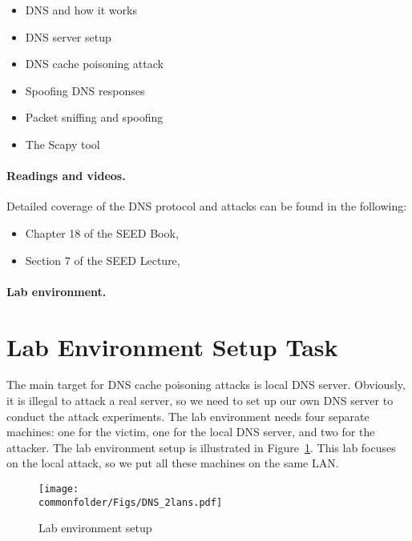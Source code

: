 \begin{itemize}[noitemsep]
\item DNS and how it works
\item DNS server setup
\item DNS cache poisoning attack
\item Spoofing DNS responses
\item Packet sniffing and spoofing
\item The Scapy tool
\end{itemize}


\paragraph{Readings and videos.}
Detailed coverage of the DNS protocol and attacks can be found in the following:

\begin{itemize}
\item Chapter 18 of the SEED Book, \seedbook
\item Section 7 of the SEED Lecture, \seedisvideo
\end{itemize}



\paragraph{Lab environment.} \seedenvironmentC





\section{Lab Environment Setup Task}
\label{sec:environment}


The main target for DNS cache poisoning attacks is
local DNS server.  Obviously, it
is illegal to attack a real server, so we need to set up our own DNS
server to  conduct the attack experiments. The lab
environment needs four separate machines:
one for the victim, one for the local DNS server, and two for the attacker.
The lab environment setup is illustrated in Figure~\ref{dns:fig:environment}.
This lab focuses on the local attack, so we put all these machines on 
the same LAN.



\begin{figure}[htb]
\centering
\texttt{[image: \\commonfolder/Figs/DNS\_2lans.pdf]}
\caption{Lab environment setup}
\label{dns:fig:environment}
\end{figure}



